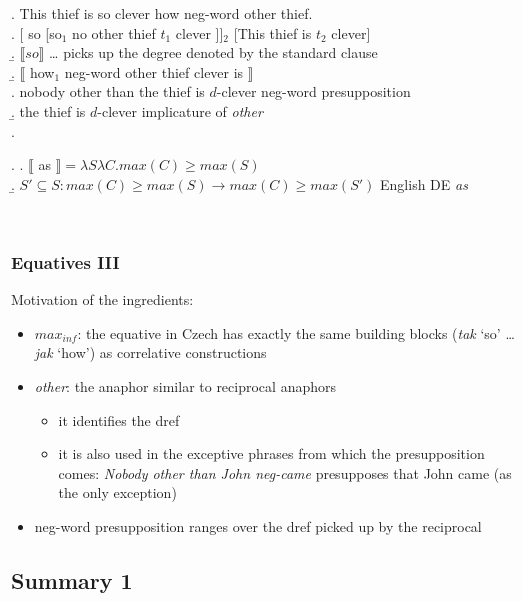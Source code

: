 \documentclass[
  letterpaper,
  DIV=11,
  numbers=noendperiod]{scrartcl}
\providecommand{\tightlist}{%
  \setlength{\itemsep}{0pt}\setlength{\parskip}{0pt}}\usepackage{longtable,booktabs,array}
\begin{document}
\ex. This thief is so clever how neg-word other thief.\\
\a. {[} so {[}so\(_1\) no other thief \(t_1\) clever {]}{]}\(_2\)
{[}This thief is \(t_2\) clever{]}\\
\b. \(\llbracket so\rrbracket\) \ldots{} picks up the degree denoted by
the standard clause\\
\b. \(\llbracket\) how\(_1\) neg-word other thief clever is
\(\rrbracket\)\\
\a. nobody other than the thief is \(d\)-clever \hfill neg-word
presupposition\\
\b. the thief is \(d\)-clever \hfill implicature of \emph{other}\\
\z.

\ex. \a. \(\llbracket\) as
\(\rrbracket = \lambda S\lambda C.max(C) \geq max(S)\)\\
\b.
\(S' \subseteq S: max(C) \geq max(S) \rightarrow max(C) \geq max(S')\)
\hfill English DE \textit{as}

~

\hypertarget{equatives-iii}{%
\subsubsection{Equatives III}\label{equatives-iii}}

Motivation of the ingredients:

\begin{itemize}
\tightlist
\item
  \(max_{inf}\): the equative in Czech has exactly the same building
  blocks (\emph{tak} `so' \ldots{} \emph{jak} `how') as correlative
  constructions
\item
  \emph{other}: the anaphor similar to reciprocal anaphors

  \begin{itemize}
  \tightlist
  \item
    it identifies the dref
  \item
    it is also used in the exceptive phrases from which the
    presupposition comes: \emph{Nobody other than John neg-came}
    presupposes that John came (as the only exception)
  \end{itemize}
\item
  neg-word presupposition ranges over the dref picked up by the
  reciprocal
\end{itemize}

\hypertarget{summary-1}{%
\subsection{Summary 1}\label{summary-1}}
\end{document}
